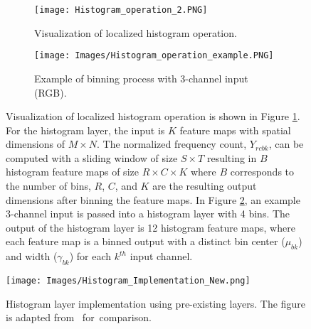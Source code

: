 \documentclass[journal]{IEEEtai}
\begin{document}
\begin{figure}[htb]
	    \centering
		\begin{subfigure}{.45\textwidth}{
		\centering
	    \texttt{[image: Histogram\_operation\_2.PNG]}
				\caption{Visualization of localized histogram operation.}
				\label{fig:ex_binning}
			}
		\end{subfigure}
		\centering
		\begin{subfigure}{.45\textwidth}{
		\centering	\texttt{[image: Images/Histogram\_operation\_example.PNG]}
				\caption{Example of binning process with 3-channel input (RGB).}
				\label{fig:hist_rgb_ex}
			}
		\end{subfigure}
	\caption{Visualization of localized histogram operation is shown in Figure \ref{fig:ex_binning}. For the histogram layer, the input is $K$ feature maps with spatial dimensions of $M \times N$. The normalized frequency count, $Y_{rcbk}$, can be computed with a sliding window of size $S \times T$ resulting in $B$ histogram feature maps of size $R \times C \times K$ where $B$ corresponds to the number of bins, $R$, $C$, and $K$ are the resulting output dimensions after binning the feature maps. In Figure \ref{fig:hist_rgb_ex}, an example 3-channel input is passed into a histogram layer with 4 bins. The output of the histogram layer is 12 histogram feature maps, where each feature map is a binned output with a distinct bin center ($\mu_{bk}$) and width ($\gamma_{bk}$) for each $k^{th}$ input channel.}
	\label{fig:Histogram_Operation}
	\end{figure}
	
\begin{figure*}[htb]
	\begin{center}
		\texttt{[image: Images/Histogram\_Implementation\_New.png]}
	\end{center}
	\caption{Histogram layer implementation using pre-existing layers. The figure is adapted from \mbox{\cite{wang2016learnable} for comparison.}}
	\label{fig:Histogram_implementation}
\end{figure*}
	
\end{document}
